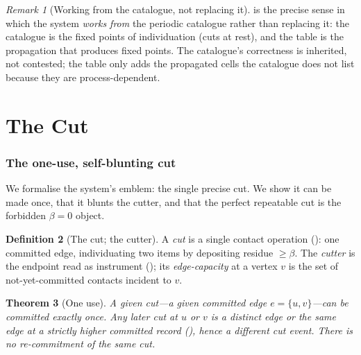 \documentclass[11pt,a4paper]{article}
\theoremstyle{thmstyle}
\newtheorem{theorem}{Theorem}[section]
\theoremstyle{definition}
\newtheorem{definition}[theorem]{Definition}
\theoremstyle{remark}
\newtheorem{remark}[theorem]{Remark}
\newcommand{\flo}{\beta}                 %
\begin{document}
\begin{remark}[Working from the catalogue, not replacing it]
\label{rem:from-catalogue}
 is the precise sense in which the system \emph{works
from} the periodic catalogue rather than replacing it: the catalogue is the
fixed points of individuation (cuts at rest), and the table is the
propagation that produces fixed points. The catalogue's correctness is
inherited, not contested; the table only adds the propagated cells the
catalogue does not list because they are process-dependent.
\end{remark}

\part{The Cut}

\section{The one-use, self-blunting cut}
\label{sec:cut}

We formalise the system's emblem: the single precise cut. We show it can
be made once, that it blunts the cutter, and that the perfect repeatable
cut is the forbidden $\flo=0$ object.

\begin{definition}[The cut; the cutter]
\label{def:thecut}
A \emph{cut} is a single contact operation (): one
committed edge, individuating two items by depositing residue $\ge\flo$.
The \emph{cutter} is the endpoint read as instrument
(); its \emph{edge-capacity} at a vertex $v$ is the set
of not-yet-committed contacts incident to $v$.
\end{definition}

\begin{theorem}[One use]
\label{thm:one-use}
A given cut---a given committed edge $e=\{u,v\}$---can be committed exactly
once. Any later cut at $u$ or $v$ is a distinct edge or the same edge at a
strictly higher committed record (), hence a different
cut event. There is no re-commitment of the same cut.
\end{theorem}
\end{document}
